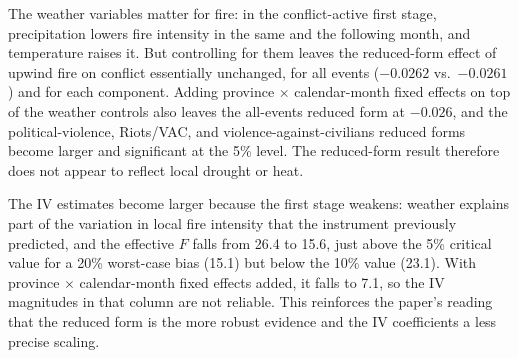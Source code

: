 \documentclass[12pt]{article}
\begin{document}
The weather variables matter for fire: in the conflict-active first stage, precipitation lowers fire intensity in the same and the following month, and temperature raises it. But controlling for them leaves the reduced-form effect of upwind fire on conflict essentially unchanged, for all events ($-0.0262$ vs.\ $-0.0261$) and for each component. Adding province $\times$ calendar-month fixed effects on top of the weather controls also leaves the all-events reduced form at $-0.026$, and the political-violence, Riots/VAC, and violence-against-civilians reduced forms become larger and significant at the 5\% level. The reduced-form result therefore does not appear to reflect local drought or heat.

The IV estimates become larger because the first stage weakens: weather explains part of the variation in local fire intensity that the instrument previously predicted, and the effective $F$ falls from 26.4 to 15.6, just above the 5\% critical value for a 20\% worst-case bias (15.1) but below the 10\% value (23.1). With province $\times$ calendar-month fixed effects added, it falls to 7.1, so the IV magnitudes in that column are not reliable. This reinforces the paper's reading that the reduced form is the more robust evidence and the IV coefficients a less precise scaling.



\end{document}
